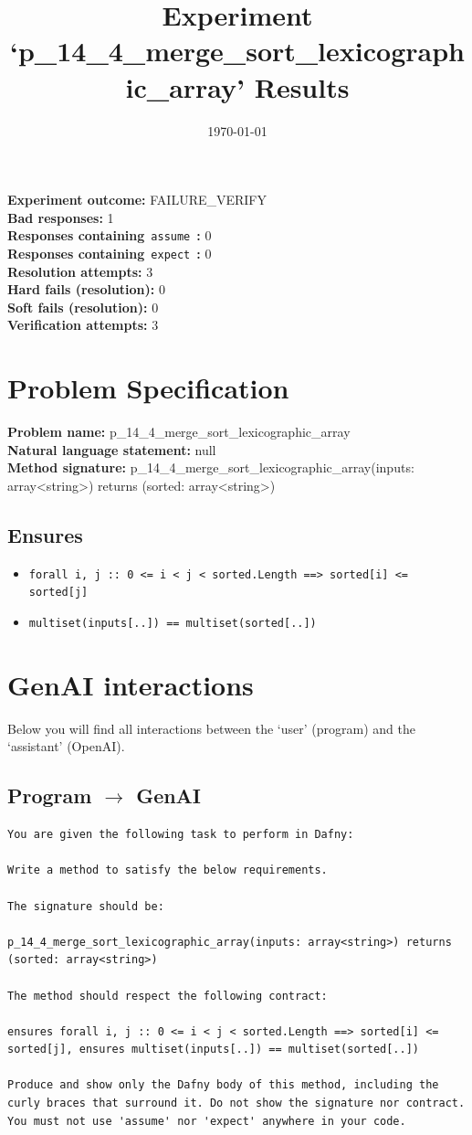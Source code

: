 \documentclass{article}
\begin{document}
\title{Experiment `p\_14\_4\_merge\_sort\_lexicographic\_array' Results}
\author{\today}
\date{}
\maketitle
\textbf{Experiment outcome: }FAILURE\_VERIFY
\\\textbf{Bad responses: }1
\\\textbf{Responses containing}~\texttt{assume}~\textbf{: }0
\\\textbf{Responses containing}~\texttt{expect}~\textbf{: }0
\\\textbf{Resolution attempts: }3
\\\textbf{Hard fails (resolution): }0
\\\textbf{Soft fails (resolution): }0
\\\textbf{Verification attempts: }3
\section*{Problem Specification}
\textbf{Problem name: }p\_14\_4\_merge\_sort\_lexicographic\_array
\\\textbf{Natural language statement: }null
\\\textbf{Method signature: }p\_14\_4\_merge\_sort\_lexicographic\_array(inputs: array<string>) returns (sorted: array<string>)
\subsection*{Ensures}
\begin{itemize}
\item \texttt{forall i, j :: 0 <= i < j < sorted.Length ==> sorted[i] <= sorted[j]}
\item \texttt{multiset(inputs[..]) == multiset(sorted[..])}
\end{itemize}
\clearpage
\section*{GenAI interactions}
Below you will find all interactions between the `user' (program) and the `assistant' (OpenAI).
\subsection*{Program $\rightarrow$ GenAI}
\begin{lstlisting}
You are given the following task to perform in Dafny:

Write a method to satisfy the below requirements.

The signature should be:

p_14_4_merge_sort_lexicographic_array(inputs: array<string>) returns (sorted: array<string>)

The method should respect the following contract:

ensures forall i, j :: 0 <= i < j < sorted.Length ==> sorted[i] <= sorted[j], ensures multiset(inputs[..]) == multiset(sorted[..])

Produce and show only the Dafny body of this method, including the curly braces that surround it. Do not show the signature nor contract. You must not use 'assume' nor 'expect' anywhere in your code.
\end{lstlisting}
\end{document}
